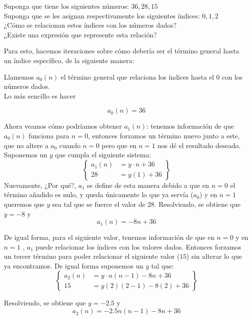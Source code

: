 
Suponga que tiene los siguientes números: $36, 28, 15$\\
Suponga que se les asignan respectivamente los siguientes índices: $0, 1, 2$\\
¿Cómo se relacionan estos índices con los números dados?\\
¿Existe una expresión que represente esta relación?

Para esto, hacemos iteraciones sobre cómo debería ser el término general hasta un índice específico, de la siguiente manera:

\vspace{10pt}
Llamemos $a_0(n)$ el término general que relaciona los índices hasta el $0$ con los números dados.\\
Lo más sencillo es hacer

\[a_0(n) = 36\]

Ahora veamos cómo podríamos obtener $a_1(n)$: tenemos información de que
$a_0(n)$ funciona para $n = 0$, entonces forzamos un término nuevo junto
a este, que no altere a $a_0$ cuando $n=0$ pero que en $n=1$ nos dé el
resultado deseado.
Suponemos un $y$ que cumpla el siguiente sistema:
\begin{equation*}
    \left\{
        \begin{aligned}
            a_1(n) &= y\cdot n + 36\\
            28 &= y(1) + 36
        \end{aligned}
    \right\}
\end{equation*}
Nuevamente, ¿Por qué?, $a_1$ se define de esta manera debido a que en $n=0$ el término añadido es nulo, y queda únicamente lo que ya servía ($a_0$) y en $n=1$ queremos que $y$ sea tal que se fuerce el valor de $28$.
Resolviendo, se obtiene que $y = -8$ y
\[a_1(n) = -8n + 36\]

De igual forma, para el siguiente valor, tenemos información de que en $n=0$ y en $n=1$ , $a_1$ puede relacionar los índices con los valores dados. Entonces forzamos un tercer término para poder relacionar el siguiente valor ($15$) sin alterar lo que ya encontramos. De igual forma suponemos un $y$ tal que:
\begin{equation*}
    \left\{
        \begin{aligned}
            a_2(n) &= y\cdot n(n-1) -8n + 36\\
            15 &= y (2)(2-1) - 8(2) + 36
        \end{aligned}
    \right\}
\end{equation*}

{\noindent Resolviendo, se obtiene que $y = -2.5$ y}
\[a_2(n) = -2.5n(n-1) - 8n + 36\]